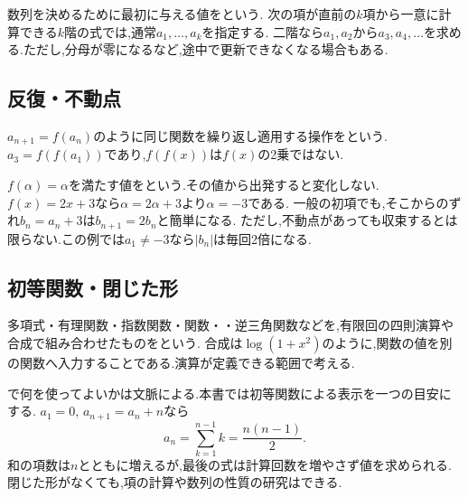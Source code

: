     数列を決めるために最初に与える値を\textbf{}という.
    次の項が直前の$k$項から一意に計算できる$k$階の式では,通常$a_1,\ldots,a_k$を指定する.
    二階なら$a_1,a_2$から$a_3,a_4,\ldots$を求める.ただし,分母が零になるなど,途中で更新できなくなる場合もある.

  \subsection{反復・不動点}\label{節：反復・不動点}
    $a_{n+1}=f(a_n)$のように同じ関数を繰り返し適用する操作を\textbf{}という.
    $a_3=f(f(a_1))$であり,$f(f(x))$は$f(x)$の2乗ではない.

    $f(\alpha)=\alpha$を満たす値を\textbf{}という.その値から出発すると変化しない.
    $f(x)=2x+3$なら$\alpha=2\alpha+3$より$\alpha=-3$である.
    一般の初項でも,そこからのずれ$b_n=a_n+3$は$b_{n+1}=2b_n$と簡単になる.
    ただし,不動点があっても収束するとは限らない.この例では$a_1\ne-3$なら$|b_n|$は毎回2倍になる.

  \subsection{初等関数・閉じた形}\label{節：初等関数・閉じた形}
    多項式・有理関数・指数関数・関数・・逆三角関数などを,有限回の四則演算や合成で組み合わせたものを\textbf{}という.
    合成は$\log(1+x^2)$のように,関数の値を別の関数へ入力することである.演算が定義できる範囲で考える.

    \textbf{}で何を使ってよいかは文脈による.本書では初等関数による表示を一つの目安にする.
    $a_1=0$, $a_{n+1}=a_n+n$なら
    \[
      a_n=\sum_{k=1}^{n-1}k=\frac{n(n-1)}2.
    \]
    和の項数は$n$とともに増えるが,最後の式は計算回数を増やさず値を求められる.
    閉じた形がなくても,項の計算や数列の性質の研究はできる.
